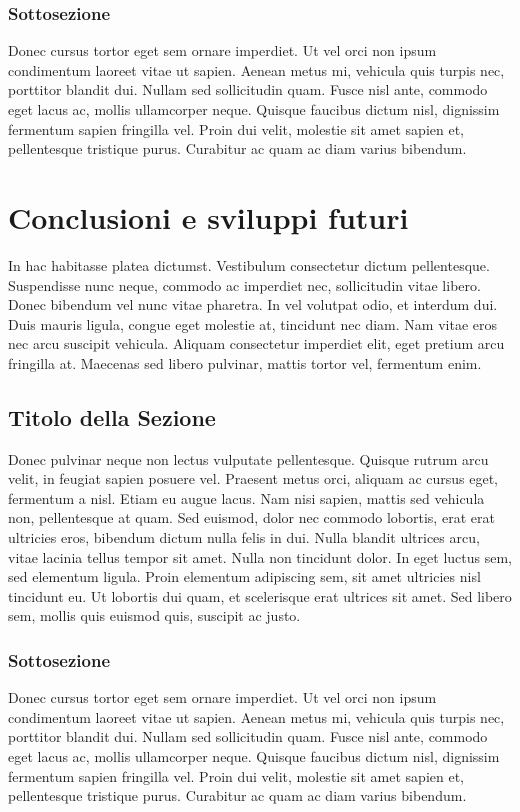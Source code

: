\documentclass[target=mst,aauheader=,style=]{thud}
\begin{document}
\subsection{Sottosezione}
Donec cursus tortor eget sem ornare imperdiet. Ut vel orci non ipsum condimentum laoreet vitae ut sapien. Aenean metus mi, vehicula quis turpis nec, porttitor blandit dui. Nullam sed sollicitudin quam. Fusce nisl ante, commodo eget lacus ac, mollis ullamcorper neque. Quisque faucibus dictum nisl, dignissim fermentum sapien fringilla vel. Proin dui velit, molestie sit amet sapien et, pellentesque tristique purus. Curabitur ac quam ac diam varius bibendum.

\chapter{Conclusioni e sviluppi futuri}
In hac habitasse platea dictumst. Vestibulum consectetur dictum pellentesque. Suspendisse nunc neque, commodo ac imperdiet nec, sollicitudin vitae libero. Donec bibendum vel nunc vitae pharetra. In vel volutpat odio, et interdum dui. Duis mauris ligula, congue eget molestie at, tincidunt nec diam. Nam vitae eros nec arcu suscipit vehicula. Aliquam consectetur imperdiet elit, eget pretium arcu fringilla at. Maecenas sed libero pulvinar, mattis tortor vel, fermentum enim.

\section{Titolo della Sezione}
Donec pulvinar neque non lectus vulputate pellentesque. Quisque rutrum arcu velit, in feugiat sapien posuere vel. Praesent metus orci, aliquam ac cursus eget, fermentum a nisl. Etiam eu augue lacus. Nam nisi sapien, mattis sed vehicula non, pellentesque at quam. Sed euismod, dolor nec commodo lobortis, erat erat ultricies eros, bibendum dictum nulla felis in dui. Nulla blandit ultrices arcu, vitae lacinia tellus tempor sit amet. Nulla non tincidunt dolor. In eget luctus sem, sed elementum ligula. Proin elementum adipiscing sem, sit amet ultricies nisl tincidunt eu. Ut lobortis dui quam, et scelerisque erat ultrices sit amet. Sed libero sem, mollis quis euismod quis, suscipit ac justo.

\subsection{Sottosezione}
Donec cursus tortor eget sem ornare imperdiet. Ut vel orci non ipsum condimentum laoreet vitae ut sapien. Aenean metus mi, vehicula quis turpis nec, porttitor blandit dui. Nullam sed sollicitudin quam. Fusce nisl ante, commodo eget lacus ac, mollis ullamcorper neque. Quisque faucibus dictum nisl, dignissim fermentum sapien fringilla vel. Proin dui velit, molestie sit amet sapien et, pellentesque tristique purus. Curabitur ac quam ac diam varius bibendum.
\end{document}
